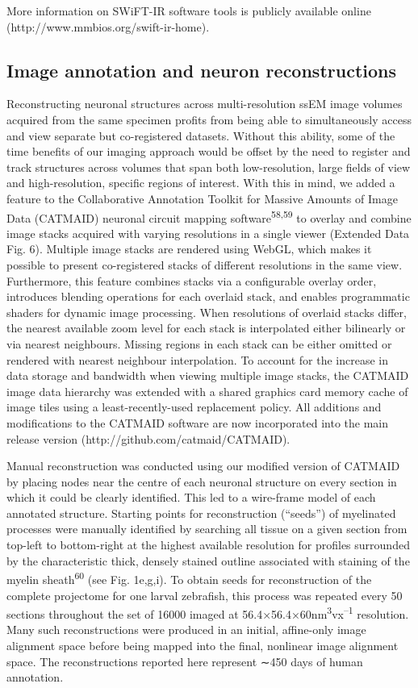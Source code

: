 \documentclass{article}
\begin{document}
More information on SWiFT-IR software tools is publicly available online (http://www.mmbios.org/swift-ir-home).

\subsection*{Image annotation and neuron reconstructions}

Reconstructing neuronal structures across multi-resolution ssEM image volumes acquired from the same specimen profits from being able to simultaneously access and view separate but co-registered datasets. Without this ability, some of the time benefits of our imaging approach would be offset by the need to register and track structures across volumes that span both low-resolution, large fields of view and high-resolution, specific regions of interest. With this in mind, we added a feature to the Collaborative Annotation Toolkit for Massive Amounts of Image Data (CATMAID) neuronal circuit mapping software\textsuperscript{58,59} to overlay and combine image stacks acquired with varying resolutions in a single viewer (Extended Data Fig. 6). Multiple image stacks are rendered using WebGL, which makes it possible to present co-registered stacks of different resolutions in the same view. Furthermore, this feature combines stacks via a configurable overlay order, introduces blending operations for each overlaid stack, and enables programmatic shaders for dynamic image processing. When resolutions of overlaid stacks differ, the nearest available zoom level for each stack is interpolated either bilinearly or via nearest neighbours. Missing regions in each stack can be either omitted or rendered with nearest neighbour interpolation. To account for the increase in data storage and bandwidth when viewing
multiple image stacks, the CATMAID image data hierarchy was extended with a shared graphics card memory cache of image tiles using a least-recently-used replacement policy. All additions and modifications to the CATMAID software are now incorporated into the main release version (http://github.com/catmaid/CATMAID).

Manual reconstruction was conducted using our modified version of CATMAID by placing nodes near the centre of each neuronal structure on every section in which it could be clearly identified. This led to a wire-frame model of each annotated structure. Starting points for reconstruction (“seeds”) of myelinated processes were manually identified by searching all tissue on a given section from top-left to bottom-right at the highest available resolution for profiles surrounded by the characteristic thick, densely stained outline associated with staining of the myelin sheath\textsuperscript{60} (see Fig. 1e,g,i). To obtain seeds for reconstruction of the complete projectome for one larval zebrafish, this process was repeated every 50 sections throughout the set of 16000 imaged at 56.4×56.4×60nm\textsuperscript{3}vx\textsuperscript{–1} resolution. Many such reconstructions were produced in an initial, affine-only image alignment space before being mapped into the final, nonlinear image alignment space. The reconstructions reported here represent ∼450 days of human annotation.
\end{document}
